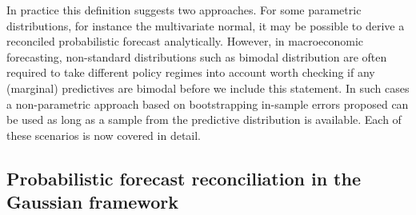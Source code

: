 \documentclass[graybox]{svmult}
\begin{document}
In practice this definition suggests two approaches.  For some parametric distributions, for instance the multivariate normal, it may be possible to derive a reconciled probabilistic forecast analytically.  However, in macroeconomic forecasting, non-standard distributions such as bimodal distribution are often required to take different policy regimes into account {\color{red} worth checking if any (marginal) predictives are bimodal before we include this statement}.  In such cases a non-parametric approach based on bootstrapping in-sample errors proposed \cite{Gamakumara2018} can be used as long as a sample from the predictive distribution is available.  Each of these scenarios is now covered in detail.

\subsection{Probabilistic forecast reconciliation in the Gaussian framework}


\end{document}
